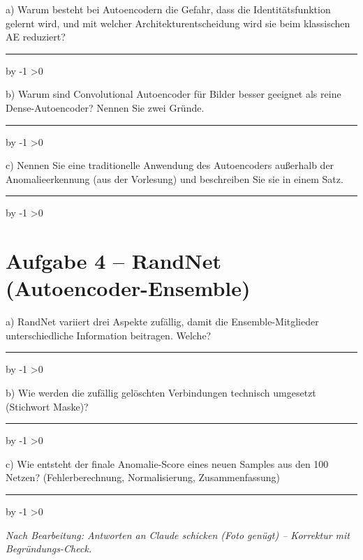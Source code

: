 \documentclass[10pt,a4paper]{article}
\newcommand{\antwortlinien}[1]{%
  \par\vspace{2pt}%
  \newcount\zeilen \zeilen=#1
  \loop
    \noindent\rule{\linewidth}{0.4pt}\par\vspace{11pt}%
    \advance\zeilen by -1
  \ifnum\zeilen>0 \repeat
}
\begin{document}
a) Warum besteht bei Autoencodern die Gefahr, dass die Identitätsfunktion gelernt wird,
und mit welcher Architekturentscheidung wird sie beim klassischen AE reduziert?
\antwortlinien{3}

b) Warum sind Convolutional Autoencoder für Bilder besser geeignet als reine
Dense-Autoencoder? Nennen Sie zwei Gründe.
\antwortlinien{2}

c) Nennen Sie eine traditionelle Anwendung des Autoencoders außerhalb der
Anomalieerkennung (aus der Vorlesung) und beschreiben Sie sie in einem Satz.
\antwortlinien{2}

\section*{Aufgabe 4 -- RandNet (Autoencoder-Ensemble)}

a) RandNet variiert drei Aspekte zufällig, damit die Ensemble-Mitglieder unterschiedliche
Information beitragen. Welche?
\antwortlinien{3}

b) Wie werden die zufällig \glqq gelöschten\grqq{} Verbindungen technisch umgesetzt
(Stichwort Maske)?
\antwortlinien{3}

c) Wie entsteht der finale Anomalie-Score eines neuen Samples aus den 100 Netzen?
(Fehlerberechnung, Normalisierung, Zusammenfassung)
\antwortlinien{3}

\vspace{10pt}
\begin{center}
\footnotesize\itshape
Nach Bearbeitung: Antworten an Claude schicken (Foto genügt) -- Korrektur mit Begründungs-Check.
\end{center}
\end{document}
